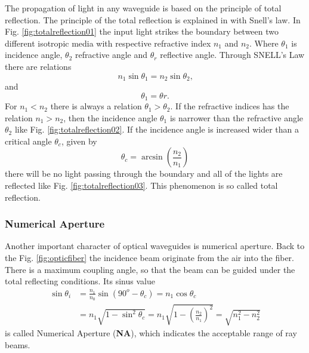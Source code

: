 The propagation of light in any waveguide is based on the principle of total reflection. The principle of the total reflection is explained in \cite{optical_waveguides_fibers} with Snell's law. In Fig. \ref{fig:totalreflection01} the input light strikes the boundary between two different isotropic media with respective refractive index $n_{1}$ and $n_{2}$. Where $\theta_{1}$ is incidence angle, $\theta_{2}$ refractive angle and $\theta_{r}$ reflective angle. Through SNELL's Law there are relations  
\begin{equation*}
n_{1}\sin\theta_{1}=n_{2}\sin\theta_{2} \text{,}
\end{equation*}
and
\begin{equation*}
\theta_{1}=\theta{r} \text{.}
\end{equation*}
For $n_{1}<n_{2}$ there is  always a relation $\theta_{1}>\theta_{2}$.  If the refractive indices has the relation $n_{1}>n_{2}$, then the incidence angle $\theta_{1}$ is narrower than the refractive angle $\theta_{2}$ like Fig. \ref{fig:totalreflection02}. If the incidence angle is increased wider than a critical angle $\theta_{c}$, given by 
\begin{equation}
\theta_{c}=\arcsin(\frac{n_{2}}{n_{1}})
\label{eq:critical_angle}
\end{equation}
there will be no light passing through the boundary and all of the lights are reflected like Fig. \ref{fig:totalreflection03}. This phenomenon is so called total reflection.\\
\subsubsection*{Numerical Aperture }
Another important character of optical waveguides is numerical aperture. Back to the Fig. \ref{fig:opticfiber} the incidence beam originate from the air into the fiber. There is a maximum coupling angle, so that the beam can be guided under the total reflecting conditions. Its sinus value 
\begin{align}
\sin\theta_{i}&=\frac{n_{1}}{n_{0}}\sin(90^{o}-\theta_{c})=n_{1}\cos\theta_{c} \nonumber\\
&=n_{1}\sqrt{1-\sin^{2}\theta_{c}}=n_{1}\sqrt{1-\left(\frac{n_{2}}{n_{1}}\right)^2}=\sqrt{n^2_{1}-n^2_{2}}
\label{eq:NA}
\end{align}
 is called Numerical Aperture (\textbf{NA}), which indicates the acceptable range of ray beams.
